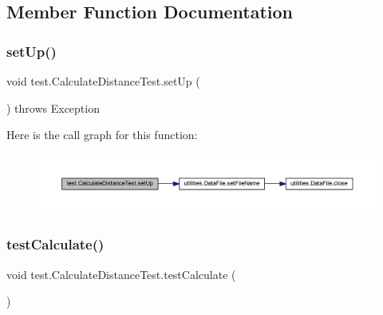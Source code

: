 \subsection{Member Function Documentation}
\mbox{\label{classtest_1_1_calculate_distance_test_a6af11430659ffdfbf1f30b96b68bf642}} 
\subsubsection{\texorpdfstring{set\+Up()}{setUp()}}
{\footnotesize\ttfamily void test.\+Calculate\+Distance\+Test.\+set\+Up (\begin{DoxyParamCaption}{ }\end{DoxyParamCaption}) throws Exception}

Here is the call graph for this function\+:\nopagebreak
\begin{figure}[H]
\begin{center}
\leavevmode
\includegraphics[width=350pt]{classtest_1_1_calculate_distance_test_a6af11430659ffdfbf1f30b96b68bf642_cgraph}
\end{center}
\end{figure}
\mbox{\label{classtest_1_1_calculate_distance_test_ae21407ac9f926798d08a69dfdbb6fcbe}} 
\subsubsection{\texorpdfstring{test\+Calculate()}{testCalculate()}}
{\footnotesize\ttfamily void test.\+Calculate\+Distance\+Test.\+test\+Calculate (\begin{DoxyParamCaption}{ }\end{DoxyParamCaption})}


